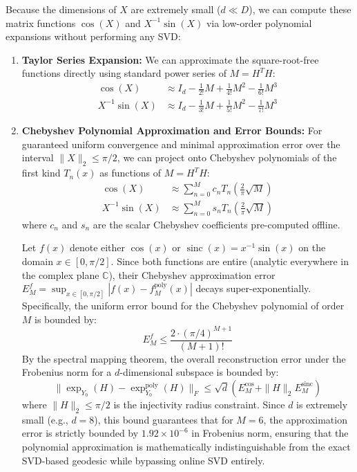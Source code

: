 Because the dimensions of $X$ are extremely small ($d \ll D$), we can compute these matrix functions $\cos(X)$ and $X^{-1}\sin(X)$ via low-order polynomial expansions without performing any SVD:
\begin{enumerate}
    \item \textbf{Taylor Series Expansion:} We can approximate the square-root-free functions directly using standard power series of $M = H^T H$:
    \begin{align}
        \cos(X) &\approx I_d - \frac{1}{2!} M + \frac{1}{4!} M^2 - \frac{1}{6!} M^3 \\
        X^{-1}\sin(X) &\approx I_d - \frac{1}{3!} M + \frac{1}{5!} M^2 - \frac{1}{7!} M^3
    \end{align}
    \item \textbf{Chebyshev Polynomial Approximation and Error Bounds:} For guaranteed uniform convergence and minimal approximation error over the interval $\|X\|_2 \le \pi/2$, we can project onto Chebyshev polynomials of the first kind $T_n(x)$ as functions of $M = H^T H$:
    \begin{align}
        \cos(X) &\approx \sum_{n=0}^M c_n T_n\left(\frac{2}{\pi} \sqrt{M}\right) \\
        X^{-1}\sin(X) &\approx \sum_{n=0}^M s_n T_n\left(\frac{2}{\pi} \sqrt{M}\right)
    \end{align}
    where $c_n$ and $s_n$ are the scalar Chebyshev coefficients pre-computed offline.
    
    \begin{proposition}
    \label{prop:cheb_bounds}
    Let $f(x)$ denote either $\cos(x)$ or $\operatorname{sinc}(x) = x^{-1}\sin(x)$ on the domain $x \in [0, \pi/2]$. Since both functions are entire (analytic everywhere in the complex plane $\mathbb{C}$), their Chebyshev approximation error $E_M^f = \sup_{x \in [0, \pi/2]} |f(x) - f^{\text{poly}}_M(x)|$ decays super-exponentially. Specifically, the uniform error bound for the Chebyshev polynomial of order $M$ is bounded by:
    \begin{equation}
        E_M^f \le \frac{2 \cdot (\pi/4)^{M+1}}{(M+1)!}
    \end{equation}
    By the spectral mapping theorem, the overall reconstruction error under the Frobenius norm for a $d$-dimensional subspace is bounded by:
    \begin{equation}
        \| \exp_{Y_0}(H) - \exp_{Y_0}^{\text{poly}}(H) \|_F \le \sqrt{d} \left( E_M^{\cos} + \|H\|_2 E_M^{\text{sinc}} \right)
    \end{equation}
    where $\|H\|_2 \le \pi/2$ is the injectivity radius constraint. Since $d$ is extremely small (e.g., $d=8$), this bound guarantees that for $M=6$, the approximation error is strictly bounded by $1.92 \times 10^{-6}$ in Frobenius norm, ensuring that the polynomial approximation is mathematically indistinguishable from the exact SVD-based geodesic while bypassing online SVD entirely.
    \end{proposition}


\end{enumerate}
